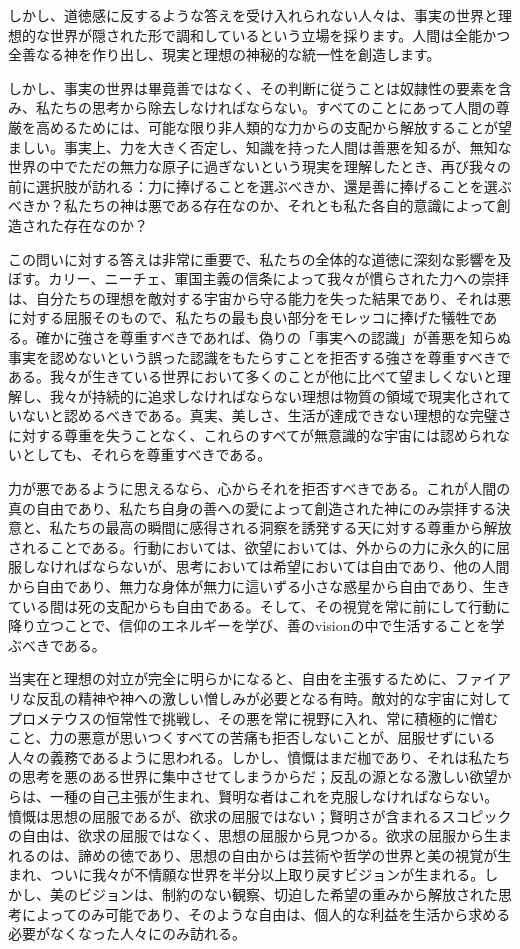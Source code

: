 \documentclass[a4paper,11pt,openany]{ltjsbook}
\begin{document}
しかし、道徳感に反するような答えを受け入れられない人々は、事実の世界と理想的な世界が隠された形で調和しているという立場を採ります。人間は全能かつ全善なる神を作り出し、現実と理想の神秘的な統一性を創造します。

しかし、事実の世界は畢竟善ではなく、その判断に従うことは奴隷性の要素を含み、私たちの思考から除去しなければならない。すべてのことにあって人間の尊厳を高めるためには、可能な限り非人類的な力からの支配から解放することが望ましい。事実上、力を大きく否定し、知識を持った人間は善悪を知るが、無知な世界の中でただの無力な原子に過ぎないという現実を理解したとき、再び我々の前に選択肢が訪れる：力に捧げることを選ぶべきか、還是善に捧げることを選ぶべきか？私たちの神は悪である存在なのか、それとも私た各自的意識によって創造された存在なのか？

この問いに対する答えは非常に重要で、私たちの全体的な道徳に深刻な影響を及ぼす。カリー、ニーチェ、軍国主義の信条によって我々が慣らされた力への崇拝は、自分たちの理想を敵対する宇宙から守る能力を失った結果であり、それは悪に対する屈服そのもので、私たちの最も良い部分をモレッコに捧げた犠牲である。確かに強さを尊重すべきであれば、偽りの「事実への認識」が善悪を知らぬ事実を認めないという誤った認識をもたらすことを拒否する強さを尊重すべきである。我々が生きている世界において多くのことが他に比べて望ましくないと理解し、我々が持続的に追求しなければならない理想は物質の領域で現実化されていないと認めるべきである。真実、美しさ、生活が達成できない理想的な完璧さに対する尊重を失うことなく、これらのすべてが無意識的な宇宙には認められないとしても、それらを尊重すべきである。

力が悪であるように思えるなら、心からそれを拒否すべきである。これが人間の真の自由であり、私たち自身の善への愛によって創造された神にのみ崇拝する決意と、私たちの最高の瞬間に感得される洞察を誘発する天に対する尊重から解放されることである。行動においては、欲望においては、外からの力に永久的に屈服しなければならないが、思考においては希望においては自由であり、他の人間から自由であり、無力な身体が無力に這いずる小さな惑星から自由であり、生きている間は死の支配からも自由である。そして、その視覚を常に前にして行動に降り立つことで、信仰のエネルギーを学び、善のvisionの中で生活することを学ぶべきである。

当実在と理想の対立が完全に明らかになると、自由を主張するために、ファイアリな反乱の精神や神への激しい憎しみが必要となる有時。敵対的な宇宙に対してプロメテウスの恒常性で挑戦し、その悪を常に視野に入れ、常に積極的に憎むこと、力の悪意が思いつくすべての苦痛も拒否しないことが、屈服せずにいる人々の義務であるように思われる。しかし、憤慨はまだ枷であり、それは私たちの思考を悪のある世界に集中させてしまうからだ；反乱の源となる激しい欲望からは、一種の自己主張が生まれ、賢明な者はこれを克服しなければならない。憤慨は思想の屈服であるが、欲求の屈服ではない；賢明さが含まれるスコピックの自由は、欲求の屈服ではなく、思想の屈服から見つかる。欲求の屈服から生まれるのは、諦めの徳であり、思想の自由からは芸術や哲学の世界と美の視覚が生まれ、ついに我々が不情願な世界を半分以上取り戻すビジョンが生まれる。しかし、美のビジョンは、制約のない観察、切迫した希望の重みから解放された思考によってのみ可能であり、そのような自由は、個人的な利益を生活から求める必要がなくなった人々にのみ訪れる。 
\end{document}
